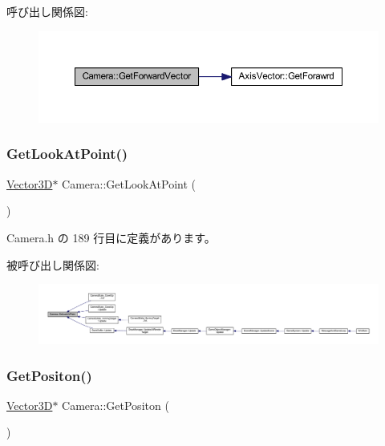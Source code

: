 呼び出し関係図\+:
\nopagebreak
\begin{figure}[H]
\begin{center}
\leavevmode
\includegraphics[width=350pt]{class_camera_aec9441c5c1924df0a0cacbcf28c839e2_cgraph}
\end{center}
\end{figure}
\mbox{\label{class_camera_a4cc3e87e6522b4a1ae72eab5b87430a6}} 
\subsubsection{\texorpdfstring{Get\+Look\+At\+Point()}{GetLookAtPoint()}}
{\footnotesize\ttfamily \mbox{\hyperlink{class_vector3_d}{Vector3D}}$\ast$ Camera\+::\+Get\+Look\+At\+Point (\begin{DoxyParamCaption}{ }\end{DoxyParamCaption})\hspace{0.3cm}{\ttfamily [inline]}}



 Camera.\+h の 189 行目に定義があります。

被呼び出し関係図\+:
\nopagebreak
\begin{figure}[H]
\begin{center}
\leavevmode
\includegraphics[width=350pt]{class_camera_a4cc3e87e6522b4a1ae72eab5b87430a6_icgraph}
\end{center}
\end{figure}
\mbox{\label{class_camera_a18f380bd6b2c42162c8fcf7e4441a355}} 
\subsubsection{\texorpdfstring{Get\+Positon()}{GetPositon()}}
{\footnotesize\ttfamily \mbox{\hyperlink{class_vector3_d}{Vector3D}}$\ast$ Camera\+::\+Get\+Positon (\begin{DoxyParamCaption}{ }\end{DoxyParamCaption})\hspace{0.3cm}{\ttfamily [inline]}}



